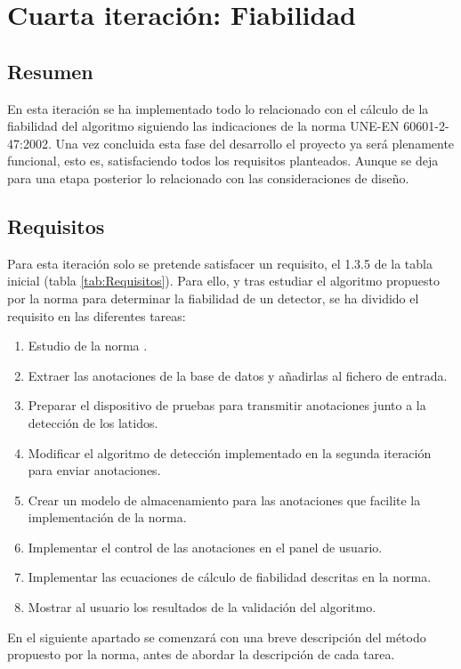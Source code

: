 
\section{Cuarta iteración: Fiabilidad}
    \subsection{Resumen}
        
        En esta iteración se ha implementado todo lo relacionado con el cálculo de la fiabilidad del algoritmo siguiendo las indicaciones de la norma UNE-EN 60601-2-47:2002. Una vez concluida esta fase del desarrollo el proyecto ya será plenamente funcional, esto es, satisfaciendo todos los requisitos planteados. Aunque se deja para una etapa posterior lo relacionado con las consideraciones de diseño.
        
    \subsection{Requisitos}
    
        Para esta iteración solo se pretende satisfacer un requisito, el 1.3.5 de la tabla inicial (tabla \ref{tab:Requisitos}). Para ello, y tras estudiar el algoritmo propuesto por la norma para determinar la fiabilidad de un detector, se ha dividido el requisito en las diferentes tareas:
        
        \begin{enumerate}
            \item Estudio de la norma \cite{Aenor2002}.
            \item Extraer las anotaciones de la base de datos y añadirlas al fichero de entrada.
            \item Preparar el dispositivo de pruebas para transmitir anotaciones junto a la detección de los latidos.
            \item Modificar el algoritmo de detección implementado en la segunda iteración para enviar anotaciones.
            \item Crear un modelo de almacenamiento para las anotaciones que facilite la implementación de la norma. \cite{Aenor2002}
            \item Implementar el control de las anotaciones en el panel de usuario.
            \item Implementar las ecuaciones de cálculo de fiabilidad descritas en la norma. \cite{Aenor2002}
            \item Mostrar al usuario los resultados de la validación del algoritmo.
        \end{enumerate}
    En el siguiente apartado se comenzará con una breve descripción del método propuesto por la norma, antes de abordar la descripción de cada tarea. 
    
